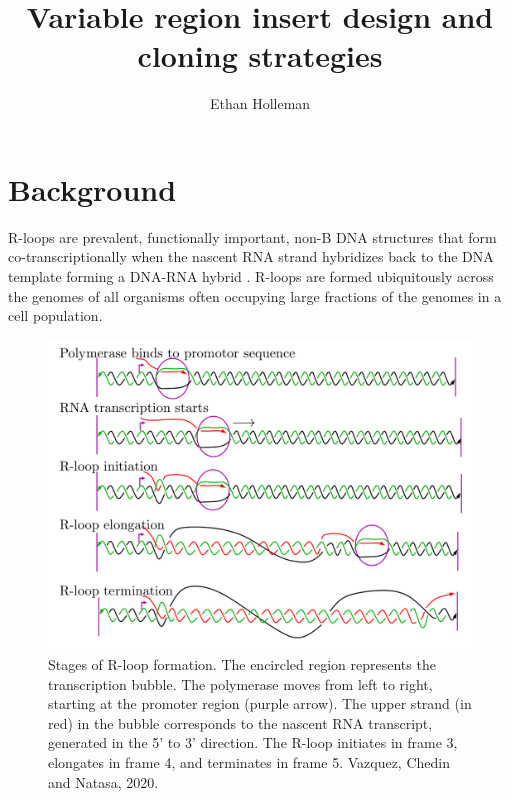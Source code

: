 \documentclass[11pt]{article}
\author{Ethan Holleman}
\title{Variable region insert design and cloning strategies}
\begin{document}
\maketitle

\tableofcontents
\pagebreak

\section{Background}

R-loops are prevalent, functionally important, non-B DNA structures that form co-transcriptionally when the nascent RNA strand hybridizes back to the DNA template forming a DNA-RNA hybrid \cite{chedin_nascent_2016}. R-loops are formed ubiquitously across the genomes of all organisms often occupying large fractions of the genomes in a cell population. 

\begin{figure}[H]
	\includegraphics[width=12cm]{images/r-loops/rloop_stages.png}
	\centering
	\caption{Stages of R-loop formation. The encircled region represents the transcription bubble. The polymerase moves from left to right, starting at the promoter region (purple arrow). The upper strand (in red) in the bubble corresponds to the nascent RNA transcript, generated in the 5' to 3' direction. The R-loop initiates in frame 3, elongates in frame 4, and terminates in frame 5. Vazquez, Chedin and Natasa, 2020.}
	\label{fig:1}
\end{figure}
\end{document}
